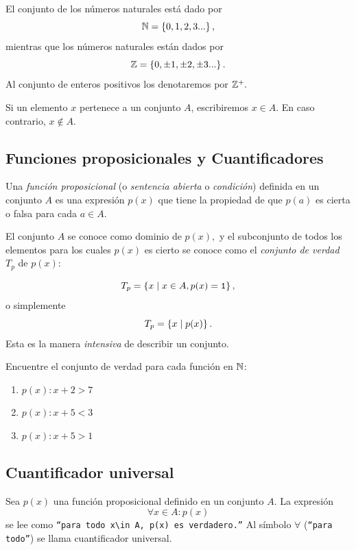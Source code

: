 	El conjunto de los números naturales está dado por
	\[ \mathbb{N} = \left\{ 0,1,2,3... \right\} ,\]
	mientras que los números naturales están dados por
	\[ \mathbb{Z} = \left\{ 0,\pm 1, \pm 2, \pm 3... \right\} .\]
	Al conjunto de enteros positivos los denotaremos por $ \mathbb{Z}^{+}. $

		Si un elemento $ x $ pertenece a un conjunto $ A $, escribiremos $ x\in A $. En caso contrario, $ x\not \in A $.

\subsection{Funciones proposicionales y Cuantificadores}


 Una \emph{función proposicional} (o \emph{sentencia abierta} o \emph{condición}) definida en un conjunto $A$ es una expresión $p(x)$ que tiene la propiedad de que $p(a)$ es cierta o falsa para cada $a \in A.$



 El conjunto $A$ se conoce como dominio de $p(x),$ y el subconjunto de todos los elementos para los cuales $p(x)$ es cierto se conoce como el \emph{conjunto de verdad} $T_{p}$ de $p(x):$

 $$T_{p}=\left\{ x \mid x\in A, p(x)=\texttt{1} \right\},$$
 o simplemente
 $$
 T_{p}=\left\{ x \mid p(x) \right\}.
 $$
Esta es la manera \emph{intensiva} de describir un conjunto.



 \begin{resuelto}
  \label{lip:exmp:4.7}
  Encuentre el conjunto de verdad para cada función en $\mathbb{N}$:
  \begin{enumerate}
   \item $p(x): x+2>7$
   \item $p(x): x+5<3$
   \item $p(x): x+5>1$
  \end{enumerate}

 \end{resuelto}



\subsection{Cuantificador universal}


 Sea $p(x)$ una función proposicional definido en un conjunto $A.$ La expresión
 \[
 \label{lip:4.1}
   \forall x \in A: p(x)
 \]
 se lee como  \texttt{``para todo $x\in A,$ $p(x)$ es verdadero.''}  Al símbolo $\forall$ (\texttt{``para todo''}) se llama cuantificador universal.

